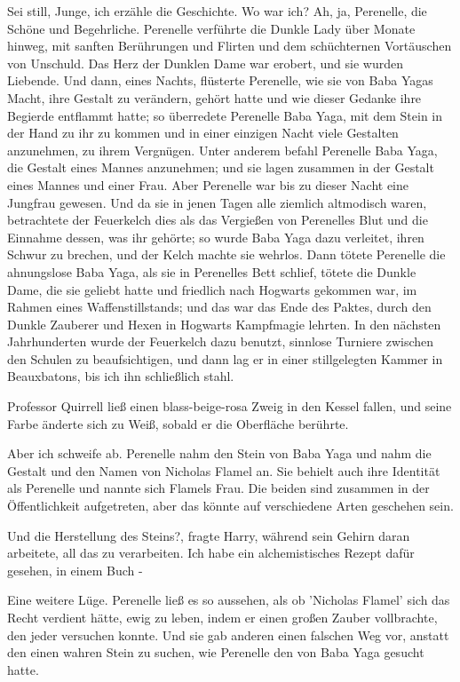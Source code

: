 \glqq{}Sei still, Junge, ich erzähle die Geschichte. Wo war ich? Ah, ja,
Perenelle, die Schöne und Begehrliche. Perenelle verführte die Dunkle Lady über
Monate hinweg, mit sanften Berührungen und Flirten und dem schüchternen
Vortäuschen von Unschuld. Das Herz der Dunklen Dame war erobert, und sie wurden
Liebende. Und dann, eines Nachts, flüsterte Perenelle, wie sie von Baba Yagas
Macht, ihre Gestalt zu verändern, gehört hatte und wie dieser Gedanke ihre
Begierde entflammt hatte; so überredete Perenelle Baba Yaga, mit dem Stein in
der Hand zu ihr zu kommen und in einer einzigen Nacht viele Gestalten
anzunehmen, zu ihrem Vergnügen. Unter anderem befahl Perenelle Baba Yaga, die
Gestalt eines Mannes anzunehmen; und sie lagen zusammen in der Gestalt eines
Mannes und einer Frau. Aber Perenelle war bis zu dieser Nacht eine Jungfrau
gewesen. Und da sie in jenen Tagen alle ziemlich altmodisch waren, betrachtete
der Feuerkelch dies als das Vergießen von Perenelles Blut und die Einnahme
dessen, was ihr gehörte; so wurde Baba Yaga dazu verleitet, ihren Schwur zu
brechen, und der Kelch machte sie wehrlos. Dann tötete Perenelle die ahnungslose
Baba Yaga, als sie in Perenelles Bett schlief, tötete die Dunkle Dame, die sie
geliebt hatte und friedlich nach Hogwarts gekommen war, im Rahmen eines
Waffenstillstands; und das war das Ende des Paktes, durch den Dunkle Zauberer
und Hexen in Hogwarts Kampfmagie lehrten. In den nächsten Jahrhunderten wurde
der Feuerkelch dazu benutzt, sinnlose Turniere zwischen den Schulen zu
beaufsichtigen, und dann lag er in einer stillgelegten Kammer in Beauxbatons,
bis ich ihn schließlich stahl.\grqq{}

Professor Quirrell ließ einen blass-beige-rosa Zweig in den Kessel fallen, und
seine Farbe änderte sich zu Weiß, sobald er die Oberfläche berührte.

\glqq{}Aber ich schweife ab. Perenelle nahm den Stein von Baba Yaga und nahm die
Gestalt und den Namen von Nicholas Flamel an. Sie behielt auch ihre Identität
als Perenelle und nannte sich Flamels Frau. Die beiden sind zusammen in der
Öffentlichkeit aufgetreten, aber das könnte auf verschiedene Arten geschehen
sein.\grqq{}

\glqq{}Und die Herstellung des Steins?\grqq{}, fragte Harry, während sein Gehirn
daran arbeitete, all das zu verarbeiten. \glqq{}Ich habe ein alchemistisches
Rezept dafür gesehen, in einem Buch -\grqq{}

\glqq{}Eine weitere Lüge. Perenelle ließ es so aussehen, als ob 'Nicholas Flamel'
sich das Recht verdient hätte, ewig zu leben, indem er einen großen Zauber
vollbrachte, den jeder versuchen konnte. Und sie gab anderen einen falschen Weg
vor, anstatt den einen wahren Stein zu suchen, wie Perenelle den von Baba Yaga
gesucht hatte.\grqq{}

